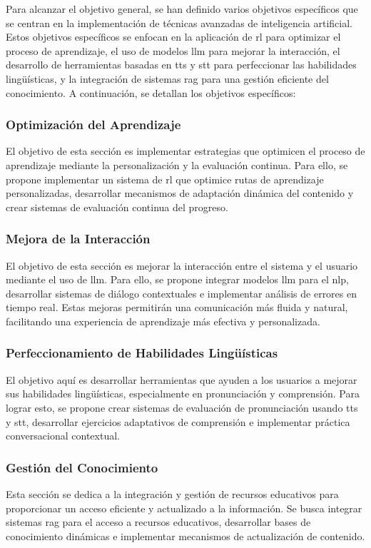 Para alcanzar el objetivo general, se han definido varios objetivos específicos que se centran en la implementación de técnicas avanzadas de inteligencia artificial. Estos objetivos específicos se enfocan en la aplicación de \gls{rl} para optimizar el proceso de aprendizaje, el uso de modelos \gls{llm} para mejorar la interacción, el desarrollo de herramientas basadas en \gls{tts} y \gls{stt} para perfeccionar las habilidades lingüísticas, y la integración de sistemas \gls{rag} para una gestión eficiente del conocimiento. A continuación, se detallan los objetivos específicos:

\subsubsection{Optimización del Aprendizaje}
El objetivo de esta sección es implementar estrategias que optimicen el proceso de aprendizaje mediante la personalización y la evaluación continua. Para ello, se propone implementar un sistema de \gls{rl} que optimice rutas de aprendizaje personalizadas, desarrollar mecanismos de adaptación dinámica del contenido y crear sistemas de evaluación continua del progreso.


\subsubsection{Mejora de la Interacción}
El objetivo de esta sección es mejorar la interacción entre el sistema y el usuario mediante el uso de \gls{llm}. Para ello, se propone integrar modelos \gls{llm} para el \gls{nlp}, desarrollar sistemas de diálogo contextuales e implementar análisis de errores en tiempo real. Estas mejoras permitirán una comunicación más fluida y natural, facilitando una experiencia de aprendizaje más efectiva y personalizada.

\subsubsection{Perfeccionamiento de Habilidades Lingüísticas}
El objetivo aquí es desarrollar herramientas que ayuden a los usuarios a mejorar sus habilidades lingüísticas, especialmente en pronunciación y comprensión. Para lograr esto, se propone crear sistemas de evaluación de pronunciación usando \gls{tts} y \gls{stt}, desarrollar ejercicios adaptativos de comprensión e implementar práctica conversacional contextual.

\subsubsection{Gestión del Conocimiento}
Esta sección se dedica a la integración y gestión de recursos educativos para proporcionar un acceso eficiente y actualizado a la información. Se busca integrar sistemas \gls{rag} para el acceso a recursos educativos, desarrollar bases de conocimiento dinámicas e implementar mecanismos de actualización de contenido.

